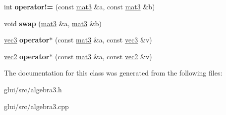 \begin{DoxyCompactItemize}
\item 
\hypertarget{classmat3_a8716eb2c3905a861aefd96b32f36ded0}{int {\bfseries operator!=} (const \hyperlink{classmat3}{mat3} \&a, const \hyperlink{classmat3}{mat3} \&b)}\label{classmat3_a8716eb2c3905a861aefd96b32f36ded0}

\item 
\hypertarget{classmat3_ac0ca53f4f00e55a17cccd57bd66b29c8}{void {\bfseries swap} (\hyperlink{classmat3}{mat3} \&a, \hyperlink{classmat3}{mat3} \&b)}\label{classmat3_ac0ca53f4f00e55a17cccd57bd66b29c8}

\item 
\hypertarget{classmat3_a46bbeb7eed270ad69b34c3a1b93eb050}{\hyperlink{classvec3}{vec3} {\bfseries operator$\ast$} (const \hyperlink{classmat3}{mat3} \&a, const \hyperlink{classvec3}{vec3} \&v)}\label{classmat3_a46bbeb7eed270ad69b34c3a1b93eb050}

\item 
\hypertarget{classmat3_a307ae299187b6d9e75b1a7730b6213c2}{\hyperlink{classvec2}{vec2} {\bfseries operator$\ast$} (const \hyperlink{classmat3}{mat3} \&a, const \hyperlink{classvec2}{vec2} \&v)}\label{classmat3_a307ae299187b6d9e75b1a7730b6213c2}

\end{DoxyCompactItemize}


The documentation for this class was generated from the following files\-:\begin{DoxyCompactItemize}
\item 
glui/src/algebra3.\-h\item 
glui/src/algebra3.\-cpp\end{DoxyCompactItemize}
